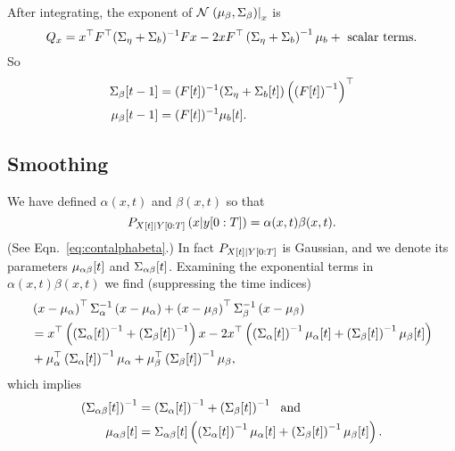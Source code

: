 After integrating, the exponent of
${\mathcal{N}}\left.\left(\mu_\beta,\Sigma_\beta\right)\right|_{x}$ is
\begin{equation*}
  Q_x = x^\top F^\top (\Sigma_\eta + \Sigma_b)^{-1} Fx - 2x
  F^\top \left(\Sigma_\eta + \Sigma_b \right)^{-1}\mu_b +
  \text{ scalar terms}. 
\end{equation*}
So
\begin{align*}
  {\Sigma_\beta}{[t-1]} &= ({F}{[t]})^{-1} ( \Sigma_\eta +
  {\Sigma_b}{[t]} ) \left( \left( {F}{[t]} \right)^{-1}
  \right)^\top
  \\
  {\mu_\beta}{[t-1]} &= ({F}{[t]})^{-1}{\mu_b}{[t]}.
\end{align*}

\subsection{Smoothing}
\label{sec:DetailSmoothing}

We have defined $\alpha(x,t)$ and $\beta(x,t)$ so that
\begin{equation*}
   P_{{X}{[t]}|Y[0:T]} \left(x|y[0:T] \right) =
   \alpha(x,t) \beta(x,t).
\end{equation*}
(See Eqn.~\eqref{eq:contalphabeta}.)  In fact
$P_{{X}{[t]}|Y[0:T]}$ is Gaussian, and we denote its parameters
${\mu_{\alpha \beta}}{[t]}$ and ${\Sigma_{\alpha \beta}}{[t]}$.
Examining the exponential terms in $\alpha(x,t) \beta(x,t)$ we find
(suppressing the time indices)
\begin{align*}
  &\left( x - \mu_\alpha \right)^\top \Sigma_\alpha^{-1} \left( x
    - \mu_\alpha \right) + \left( x - \mu_\beta \right)^\top
  \Sigma_\beta^{-1} \left( x - \mu_\beta \right)\\
  & = x^\top \left( \left( {\Sigma_{\alpha}}{[t]} \right)^{-1} + \left(
      {\Sigma_{\beta}}{[t]} \right)^{-1} \right) x - 2x^\top
  \left( \left( {\Sigma_{\alpha}}{[t]} \right)^{-1}
  {\mu_{\alpha}}{[t]} + \left( {\Sigma_{\beta}}{[t]} \right)^{-1}
  {\mu_{\beta}}{[t]} \right) \\
& + \mu_\alpha^\top  \left(
  {\Sigma_{\alpha}}{[t]} \right)^{-1} \mu_\alpha +
  \mu_\beta^\top  \left( {\Sigma_{\beta}}{[t]} \right)^{-1}
  \mu_\beta ,
\end{align*}
which implies
\begin{subequations}
  \begin{align}
    \left( {\Sigma_{\alpha \beta}}{[t]} \right)^{-1} &= \left(
      {\Sigma_{\alpha}}{[t]} \right)^{-1} + \left(
      {\Sigma_{\beta}}{[t]} \right)^{-1} ~\text{ and} \\
    {\mu_{\alpha \beta}}{[t]} &=
    {\Sigma_{\alpha \beta}}{[t]} \left( \left(
        {\Sigma_{\alpha}}{[t]} \right)^{-1} {\mu_{\alpha}}{[t]} +
      \left( {\Sigma_{\beta}}{[t]} \right)^{-1} {\mu_{\beta}}{[t]}
    \right).
\end{align}
\end{subequations}

